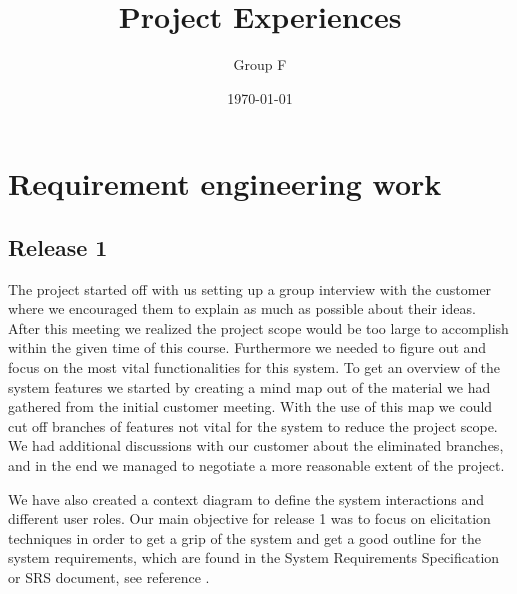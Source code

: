 \documentclass[10pt]{article}
\begin{document}
\makeatletter
\renewcommand{\@biblabel}[1]{\quad#1.}
\makeatother


\pagestyle{myheadings}





\begin{titlepage}
\title{Project Experiences}
\author{Group F}
\date{\today}
\maketitle
\thispagestyle{empty}
\end{titlepage}

\tableofcontents
\thispagestyle{empty}
\newpage
{}

\section{Requirement engineering work}
\subsection{Release 1}
The project started off with us setting up a group interview with the customer where we encouraged them to explain as much as possible about their ideas. After this meeting we realized the project scope would be too large to accomplish within the given time of this course. Furthermore we needed to figure out and focus on the most vital functionalities for this system.
To get an overview of the system features we started by creating a mind map out of the material we had gathered from the initial customer meeting. With the use of this map we could cut off branches of features not vital for the system to reduce the project scope.
We had additional discussions with our customer about the eliminated branches, and in the end we managed to negotiate a more reasonable extent of the project.

\noindent We have also created a context diagram to define the system interactions and different user roles.
Our main objective for release 1 was to focus on elicitation techniques in order to get a grip of the system and get a good outline for the system requirements, which are found in the System Requirements Specification or SRS document, see reference \cite{srs}.
\end{document}

